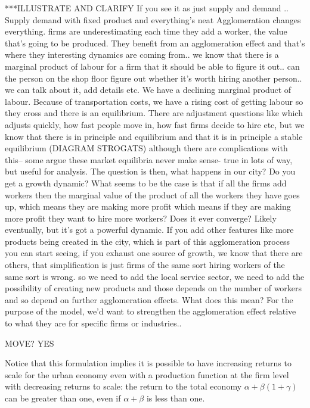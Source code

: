 \documentclass[a4paper]{article}
\theoremstyle{definition}
\theoremstyle{plain}
\begin{document}
{***ILLUSTRATE AND CLARIFY
If you see it as just supply and demand .. 
Supply demand with fixed product and everything's neat
Agglomeration changes everything. firms are underestimating each time they add a worker, the value that's going to be produced. They benefit from an agglomeration effect and that's where they interesting dynamics are coming from..
we know that there is a marginal product of labour for a firm that it should be able to figure it out.. can the person on the shop floor figure out whether it's worth hiring another person.. we can talk about it, add details etc. We have a declining marginal product of labour. Because of transportation costs, we have a rising cost of getting labour so they cross and there is an equilibrium. There are adjustment questions like which adjusts quickly, how fast people move in, how fast firms decide to hire etc, but we know that there is in principle and equilibrium and that it is in principle a stable equilibrium (DIAGRAM STROGATS) although there are complications with this-- some argue these market equilibria never make sense- true in lots of way, but useful for analysis. 
The question is then, what happens in our city? Do you get a growth dynamic? What seems to be the case is that if all the firms add workers then the marginal value of the product of all the workers they have goes up, which means they are making more profit which means if they are making more profit they want to hire more workers? Does it ever converge? Likely eventually, but it's got a powerful dynamic.  If you add other features like more products being created in the city, which is part of this agglomeration process you can start seeing, if you exhaust one source of growth, we know that there are others, that simplification is just firms of the same sort hiring workers of the same sort is wrong. so we need to add the local service sector, we need to add the possibility of creating new products and those depends on the number of workers and so depend on further agglomeration effects. What does this mean? For the purpose of the model, we'd want to strengthen the agglomeration effect relative to what they are for specific firms or industries..



MOVE?  YES

 Notice that this formulation implies it is possible to have increasing returns to scale for the urban economy even with a production function at the firm level with decreasing returns to scale: the return to the total economy $\alpha + \beta(1 + \gamma)$ can be greater than one, even if $\alpha +\beta$ is less than one. %
 
}
\end{document}
